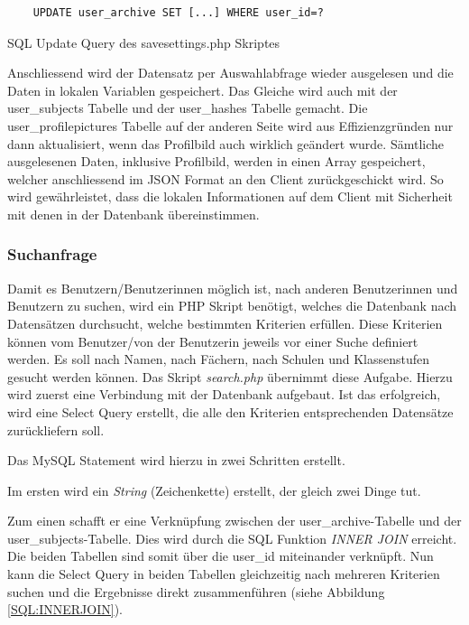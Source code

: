 \documentclass[../main.tex]{subfiles}
\begin{document}
	 \begin{code} 
	 	\begin{center}
	 		\begin{verbatim}
	UPDATE user_archive SET [...] WHERE user_id=?
	 		\end{verbatim}
	 		\caption{SQL Update Query des savesettings.php Skriptes}\label{SQL:UPDATE}
	 	\end{center}
	 \end{code}
	 
	 Anschliessend wird der Datensatz per Auswahlabfrage wieder ausgelesen und die Daten in lokalen Variablen gespeichert. Das Gleiche wird auch mit der user\_subjects Tabelle und der user\_hashes Tabelle gemacht. Die user\_profilepictures Tabelle auf der anderen Seite wird aus Effizienzgründen nur dann aktualisiert, wenn das Profilbild auch wirklich geändert wurde. Sämtliche ausgelesenen Daten, inklusive Profilbild, werden in einen Array gespeichert, welcher anschliessend im JSON Format an den Client zurückgeschickt wird. So wird gewährleistet, dass die lokalen Informationen auf dem Client mit Sicherheit mit denen in der Datenbank übereinstimmen.
	 
	 \subsubsection{Suchanfrage} \label{PHP:Suchanfrage}
	 Damit es Benutzern/Benutzerinnen möglich ist, nach anderen Benutzerinnen und Benutzern zu suchen, wird ein PHP Skript benötigt, welches die Datenbank nach Datensätzen durchsucht, welche bestimmten Kriterien erfüllen. Diese Kriterien können vom Benutzer/von der Benutzerin jeweils vor einer Suche definiert werden. Es soll nach Namen, nach Fächern, nach Schulen und Klassenstufen gesucht werden können. Das Skript \emph{search.php} übernimmt diese Aufgabe. Hierzu wird zuerst eine Verbindung mit der Datenbank aufgebaut. Ist das erfolgreich, wird eine Select Query erstellt, die alle den Kriterien entsprechenden Datensätze zurückliefern soll. 
	 
	 Das MySQL Statement wird hierzu in zwei Schritten erstellt.
	 
	 Im ersten wird ein \emph{String} (Zeichenkette) erstellt, der gleich zwei Dinge tut. 
	 
	 Zum einen schafft er eine Verknüpfung zwischen der user\_archive-Tabelle und der user\_subjects-Tabelle. Dies wird durch die SQL Funktion \emph{INNER JOIN} erreicht. Die beiden Tabellen sind somit über die user\_id miteinander verknüpft. Nun kann die Select Query in beiden Tabellen gleichzeitig nach mehreren Kriterien suchen und die Ergebnisse direkt zusammenführen (siehe Abbildung \ref{SQL:INNERJOIN}).
	 
\end{document}
